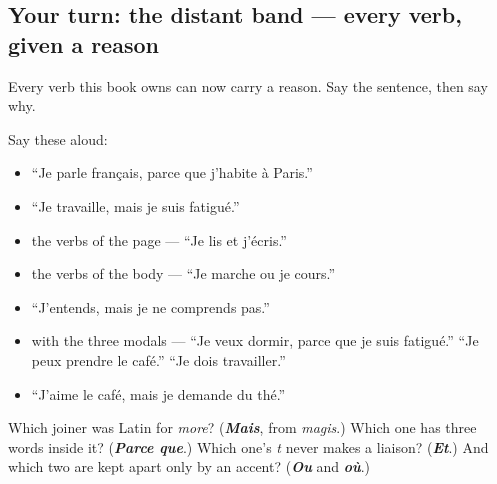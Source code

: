 \subsection*{Your turn: the distant band — every verb, given a reason}
Every verb this book owns can now carry a reason. Say the sentence, then say why.

Say these aloud:

\begin{itemize}
\raggedright
  \item \textquotedblleft{}Je parle français, parce que j'habite à Paris.\textquotedblright{}
  \item \textquotedblleft{}Je travaille, mais je suis fatigué.\textquotedblright{}
  \item the verbs of the page — \textquotedblleft{}Je lis et j'écris.\textquotedblright{}
  \item the verbs of the body — \textquotedblleft{}Je marche ou je cours.\textquotedblright{}
  \item \textquotedblleft{}J'entends, mais je ne comprends pas.\textquotedblright{}
  \item with the three modals — \textquotedblleft{}Je veux dormir, parce que je suis fatigué.\textquotedblright{} \textquotedblleft{}Je peux prendre le café.\textquotedblright{} \textquotedblleft{}Je dois travailler.\textquotedblright{}
  \item \textquotedblleft{}J'aime le café, mais je demande du thé.\textquotedblright{}
\end{itemize}

\begin{tcolorbox}[breakable,colback=teal!4,colframe=teal!35!black,title={Before you move on}]
Which joiner was Latin for \emph{more}? (\emph{\textbf{Mais}}, from \emph{magis}.) Which one has three words inside it? (\emph{\textbf{Parce que}}.) Which one's \emph{t} never makes a liaison? (\emph{\textbf{Et}}.) And which two are kept apart only by an accent? (\emph{\textbf{Ou}} and \emph{\textbf{où}}.)
\end{tcolorbox}
